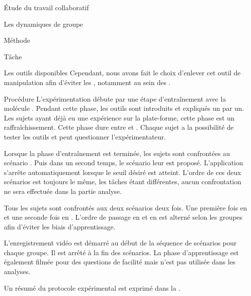 \documentclass[myfrancais]{mythesis}
\begin{document}
\begin{mypart}{Étude du travail collaboratif}
\begin{mychapter}{Les dynamiques de groupe}
\begin{mysection}{Méthode}
\begin{mysubsection}{Tâche}
\begin{mysubsubsection}{Les outils disponibles}
						Cependant, nous avons fait le choix d'enlever cet outil de manipulation afin d'éviter les , notamment au sein des .
					\end{mysubsubsection}
				\end{mysubsection}
				\begin{mysubsection}{Procédure}
					L'expérimentation débute par une étape d'entraînement avec la molécule \myTRPCAGE.
					Pendant cette phase, les outils sont introduits et expliqués un par un.
					Les sujets ayant déjà eu une expérience sur la plate-forme, cette phase est un raffraîchissement.
					Cette phase dure entre  et .
					Chaque sujet a la possibilité de tester les outils et peut questionner l'expérimentateur.

					Lorsque la phase d'entraînement est terminée, les sujets sont confrontées au scénario .
					Puis dans un second temps, le scénario  leur est proposé.
					L'application s'arrête automatiquement lorsque le seuil  désiré est atteint.
					L'ordre de ces deux scénarios est toujours le même, les tâches étant différentes, aucun confrontation ne sera effectuée dans la partie analyse.

					Tous les sujets sont confrontés aux deux scénarios deux fois.
					Une première fois en  et une seconde fois en .
					L'ordre de passage en  et en  est alterné selon les groupes afin d'éviter les biais d'apprentissage.

					L'enregistrement vidéo est démarré au début de la séquence de scénarios pour chaque groupe.
					Il est arrêté à la fin des scénarios.
					La phase d'apprentissage est également filmée pour des questions de facilité mais n'est pas utilisée dans les analyses.

					Un résumé du protocole expérimental est exprimé dans la .


\end{mysubsection}
\end{mysection}
\end{mychapter}
\end{mypart}
\end{document}
